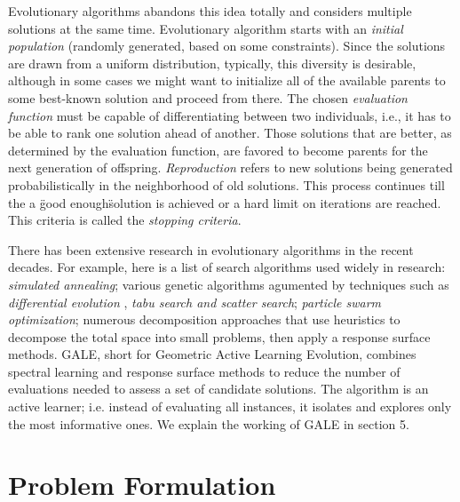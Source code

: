 \documentclass{sig-alternative}
\begin{document}
Evolutionary algorithms abandons this idea totally and considers multiple solutions at the same time. Evolutionary algorithm starts with an \textit{initial population} (randomly generated, based on some constraints). Since the solutions are drawn from a uniform distribution, typically, this diversity is desirable, although in some cases we might want to initialize all of the available parents to some best-known solution and proceed from there. The chosen \textit{evaluation function} must be capable of differentiating
between two individuals, i.e., it has to be able to rank one solution ahead
of another. Those solutions that are better, as determined by the evaluation
function, are favored to become parents for the next generation of offspring. 
\textit{Reproduction} refers to  new solutions being generated probabilistically in the neighborhood of old solutions. This process continues till the a \"good enough\" solution is achieved or a hard limit on iterations are reached. This criteria is called the \textit{stopping criteria}.
    
    There has been extensive research in evolutionary algorithms in the recent decades. For example, here is a list of search algorithms used widely in research: \textit{simulated annealing}\cite{bell2013limited, menzies2007business}; various genetic algorithms\cite{goldberg1979complexity} agumented by techniques such as \textit{differential evolution} \cite{storn1997differential}, \textit{tabu search and scatter search}\cite{nebro2008abyss, molina2007sspmo, glover1986general, beausoleil2006moss}; \textit{particle swarm optimization}\cite{pan2008particle}; numerous decomposition approaches that use heuristics to decompose the total space into small problems, then apply a response surface methods\cite{krall2014gale, zuluaga2013active}. GALE, short for Geometric Active Learning Evolution,
combines spectral learning and response surface methods
to reduce the number of evaluations needed to assess a set
of candidate solutions. The algorithm is an active learner;
i.e. instead of evaluating all instances, it isolates and explores
only the most informative ones. We explain the working of GALE in section 5.




\section{Problem Formulation}
\end{document}
